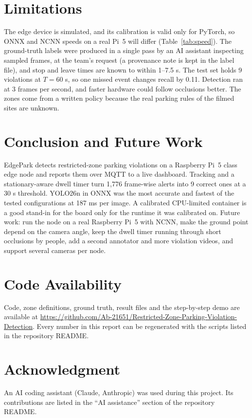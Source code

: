 \documentclass[conference]{IEEEtran}
\begin{document}
\section{Limitations}
The edge device is simulated, and its calibration is valid only for PyTorch, so ONNX and NCNN speeds on a real Pi~5 will differ (Table~\ref{tab:speed}). The ground-truth labels were produced in a single pass by an AI assistant inspecting sampled frames, at the team's request (a provenance note is kept in the label file), and stop and leave times are known to within 1--7.5 s. The test set holds 9 violations at $T = 60$ s, so one missed event changes recall by 0.11. Detection ran at 3 frames per second, and faster hardware could follow occlusions better. The zones come from a written policy because the real parking rules of the filmed sites are unknown.

\section{Conclusion and Future Work}
EdgePark detects restricted-zone parking violations on a Raspberry Pi~5 class edge node and reports them over MQTT to a live dashboard. Tracking and a stationary-aware dwell timer turn 1,776 frame-wise alerts into 9 correct ones at a 30 s threshold. YOLO26n in ONNX was the most accurate and fastest of the tested configurations at 187 ms per image. A calibrated CPU-limited container is a good stand-in for the board only for the runtime it was calibrated on. Future work: run the node on a real Raspberry Pi~5 with NCNN, make the ground point depend on the camera angle, keep the dwell timer running through short occlusions by people, add a second annotator and more violation videos, and support several cameras per node.

\section*{Code Availability}
Code, zone definitions, ground truth, result files and the step-by-step demo are available at \url{https://github.com/Ab-21651/Restricted-Zone-Parking-Violation-Detection}. Every number in this report can be regenerated with the scripts listed in the repository README.

\section*{Acknowledgment}
An AI coding assistant (Claude, Anthropic) was used during this project. Its contributions are listed in the ``AI assistance'' section of the repository README.



\end{document}
